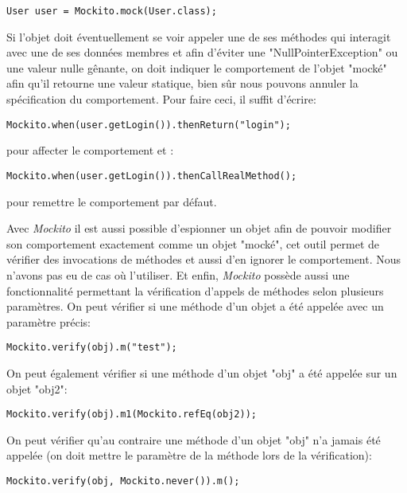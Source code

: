 \begin{lstlisting}
User user = Mockito.mock(User.class);
\end{lstlisting}\bigskip

Si l'objet doit éventuellement se voir appeler une de ses méthodes qui interagit avec une de ses données membres et afin d'éviter une "NullPointerException" ou une valeur nulle gênante, on doit indiquer le comportement de l'objet "mocké" afin qu'il retourne une valeur statique, bien sûr nous pouvons annuler la spécification du comportement. Pour faire ceci, il suffit d'écrire:

\begin{lstlisting}
Mockito.when(user.getLogin()).thenReturn("login");

\end{lstlisting}\bigskip pour affecter le comportement et :

\begin{lstlisting}
Mockito.when(user.getLogin()).thenCallRealMethod();
\end{lstlisting}\bigskip pour remettre le comportement par défaut.\newpage

Avec \textit{Mockito} il est aussi possible d'espionner un objet afin de pouvoir modifier son comportement exactement comme un objet "mocké", cet outil permet de vérifier des invocations de méthodes et aussi d'en ignorer le comportement. Nous n'avons pas eu de cas où l'utiliser.\newline
Et enfin, \textit{Mockito} possède aussi une fonctionnalité permettant la vérification d'appels de méthodes selon plusieurs paramètres. On peut vérifier si une méthode d'un objet a été appelée avec un paramètre précis:

\begin{lstlisting}
Mockito.verify(obj).m("test");
\end{lstlisting}\bigskip

On peut également vérifier si une méthode d'un objet "obj" a été appelée sur un objet "obj2":

\begin{lstlisting}
Mockito.verify(obj).m1(Mockito.refEq(obj2));
\end{lstlisting}\bigskip

On peut vérifier qu'au contraire une méthode d'un objet "obj" n'a jamais été appelée (on doit mettre le paramètre de la méthode lors de la vérification):

\begin{lstlisting}
Mockito.verify(obj, Mockito.never()).m();
\end{lstlisting}\bigskip

